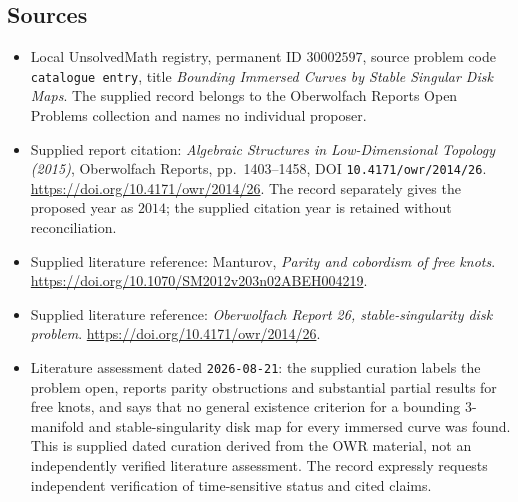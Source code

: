 \documentclass[11pt]{article}
\begin{document}
\subsection{Sources}
\begin{itemize}
\item Local UnsolvedMath registry, permanent ID \(30002597\), source problem code \texttt{catalogue entry}, title \emph{Bounding Immersed Curves by Stable Singular Disk Maps}. The supplied record belongs to the Oberwolfach Reports Open Problems collection and names no individual proposer.
\item Supplied report citation: \emph{Algebraic Structures in Low-Dimensional Topology (2015)}, Oberwolfach Reports, pp.~1403--1458, DOI \texttt{10.4171/owr/2014/26}. \url{https://doi.org/10.4171/owr/2014/26}. The record separately gives the proposed year as \(2014\); the supplied citation year is retained without reconciliation.
\item Supplied literature reference: Manturov, \emph{Parity and cobordism of free knots}. \url{https://doi.org/10.1070/SM2012v203n02ABEH004219}.
\item Supplied literature reference: \emph{Oberwolfach Report 26, stable-singularity disk problem}. \url{https://doi.org/10.4171/owr/2014/26}.
\item Literature assessment dated \texttt{2026-08-21}: the supplied curation labels the problem open, reports parity obstructions and substantial partial results for free knots, and says that no general existence criterion for a bounding \(3\)-manifold and stable-singularity disk map for every immersed curve was found. This is supplied dated curation derived from the OWR material, not an independently verified literature assessment. The record expressly requests independent verification of time-sensitive status and cited claims.
\end{itemize}
\end{document}
